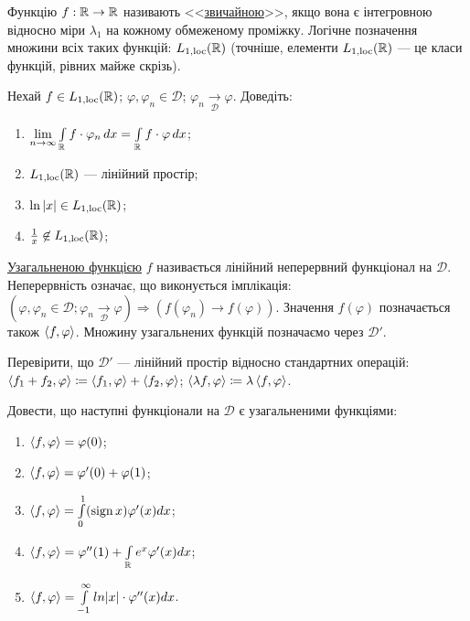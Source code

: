 \begin{theory}
    Функцію $f: \mathbb{R} \to \mathbb{R}$ називають <<\ul{звичайною}>>, якщо вона є інтегровною
    відносно міри $\lambda_1$ на кожному обмеженому проміжку. Логічне позначення множини
    всіх таких функцій: $L_{1,\mathrm{loc}}(\mathbb{R})$ (точніше, елементи $L_{1,\mathrm{loc}}(\mathbb{R})$
    --- це класи функцій, рівних майже скрізь).
\end{theory}

\begin{exercise}\label{N:3_2_8}
    Нехай $f \in L_{1,\mathrm{loc}}(\mathbb{R})$; $\varphi, \varphi_n \in \mathcal{D}$;
    $\varphi_n \underset{\mathcal{D}}{\to} \varphi$. Доведіть:
    \begin{enumerate}
        \item\label{N:3_2_8a} $\lim\limits_{n\to\infty} \int\limits_{\mathbb{R}}^{} f\cdot \varphi_n \,dx
              = \int\limits_{\mathbb{R}}^{} f\cdot \varphi \,dx$;
        \item $L_{1,\mathrm{loc}}(\mathbb{R})$ --- лінійний простір;
        \item $\ln|x| \in L_{1,\mathrm{loc}}(\mathbb{R})$;
        \item $\frac{1}{x} \not\in L_{1,\mathrm{loc}}(\mathbb{R})$;
    \end{enumerate}
\end{exercise}

\begin{theory}
    \ul{Узагальненою функцією} $f$ називається лінійний неперервний функціонал на $\mathcal{D}$.
    Неперервність означає, що виконується імплікація: $(\varphi, \varphi_n \in \mathcal{D};
    \varphi_n \underset{\mathcal{D}}{\to} \varphi)  \Rightarrow (f(\varphi_n) \to f(\varphi))$.
    Значення $f(\varphi)$ позначається також $\left\langle f, \varphi\right\rangle$. Множину узагальнених
    функцій позначаємо через $\mathcal{D}'$.
\end{theory}

\begin{exercise}
    Перевірити, що $\mathcal{D}'$ --- лінійний простір відносно стандартних операцій:
    $\left\langle f_1 + f_2, \varphi\right\rangle \coloneqq \left\langle f_1, \varphi\right\rangle + \left\langle f_2, \varphi\right\rangle$;
    $\left\langle\lambda f, \varphi\right\rangle \coloneqq \lambda \left\langle f, \varphi\right\rangle$.
\end{exercise}

\begin{exercise}
    Довести, що наступні функціонали на $\mathcal{D}$ є узагальненими функціями:
    \begin{enumerate}
        \item $\left\langle f, \varphi\right\rangle = \varphi(0)$;
        \item $\left\langle f, \varphi\right\rangle = \varphi'(0) + \varphi(1)$;
        \item $\left\langle f, \varphi\right\rangle = \int\limits_{0}^{1} (\operatorname{sign} x) \varphi'(x) dx$;
        \item $\left\langle f, \varphi\right\rangle = \varphi''(1) + \int\limits_{\mathbb{R}}^{} e^x \varphi'(x) dx$;
        \item $\left\langle f, \varphi\right\rangle = \int\limits_{-1}^{\infty} ln|x| \cdot \varphi''(x) dx$.
    \end{enumerate}
\end{exercise}

